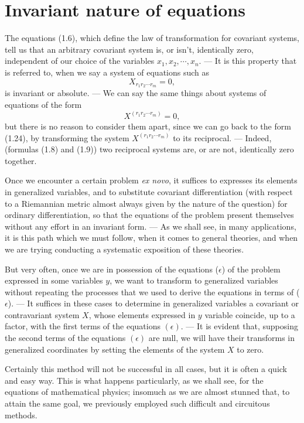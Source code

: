 \documentclass{book}
\begin{document}
\section{Invariant nature of equations}
The equations (1.6), which define the law of transformation for covariant systems, tell us that an arbitrary covariant system is, or isn't, identically zero, independent of our choice of the variables $x_1,x_2,\cdots,x_n$. --- It is this property that is referred to, when we say a system of equations such as
\begin{equation}
X_{r_1r_2\cdots r_m}=0,
\end{equation}
is invariant or absolute. --- We can say the same things about systems of equations of the form
$$X^{(r_1r_2\cdots r_m)}=0,$$
but there is no reason to consider them apart, since we can go back to the form (1.24), by transforming the system $X^{(r_1r_2\cdots r_m)}$ to its reciprocal. --- Indeed, (formulas (1.8) and (1.9)) two reciprocal systems are, or are not, identically zero together. 

Once we encounter a certain problem \emph{ex novo}, it suffices to expresses its elements in generalized variables, and to substitute covariant differentiation (with respect to a Riemannian metric almost always given by the nature of the question) for ordinary differentiation, so that the equations of the problem present themselves without any effort in an invariant form. --- As we shall see, in many applications, it is this path which we must follow, when it comes to general theories, and when we are trying conducting a systematic exposition of these theories.

But very often, once we are in possession of the equations ($\epsilon$) of the problem expressed in some variables $y$, we want to transform to generalized variables without repeating the processes that we used to derive the equations in terms of ($\epsilon$). --- It suffices in these cases to determine in generalized variables a covariant or contravariant system $X$, whose elements expressed in $y$ variable coincide, up to a factor, with the first terms of the equations $(\epsilon)$. --- It is evident that, supposing the second terms of the equations $(\epsilon)$ are null, we will have their transforms in generalized coordinates by setting the elements of the system $X$ to zero.

Certainly this method will not be successful in all cases, but it is often a quick and easy way. This is what happens particularly, as we shall see, for the equations of mathematical physics; insomuch as we are almost stunned that, to attain the same goal, we previously employed such difficult and circuitous methods. 
\end{document}
